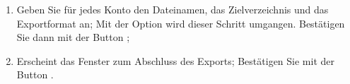 \begin{enumerate}
\begin{itemize}
\begin{itemize}
				\end{itemize}
				\Note{}: Es wird empfohlen, das Zeichen \dequote{\slash{}} im Kontonamen nicht zu verwenden, da dies beim Export in \gls{Linux-Distribution} einen Fehler verursachen kann.
			\item mit der Schaltfläche  button;
			\end{itemize}
		\item Geben Sie für jedes Konto den Dateinamen, das Zielverzeichnis und das Exportformat an; Mit der Option  wird dieser Schritt umgangen. Bestätigen Sie dann mit der Button ;
	\item Erscheint das Fenster zum Abschluss des Exports; Bestätigen Sie mit der Button .
\end{enumerate}


